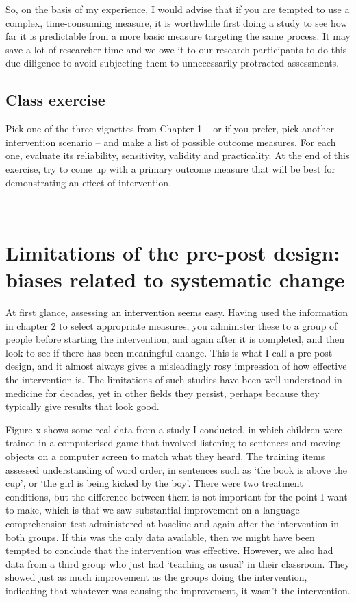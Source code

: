 \documentclass[]{book}
\begin{document}
So, on the basis of my experience, I would advise that if you are tempted to use a complex, time-consuming measure, it is worthwhile first doing a study to see how far it is predictable from a more basic measure targeting the same process. It may save a lot of researcher time and we owe it to our research participants to do this due diligence to avoid subjecting them to unnecessarily protracted assessments.

\hypertarget{class-exercise}{%
\section{Class exercise}\label{class-exercise}}

Pick one of the three vignettes from Chapter 1 -- or if you prefer, pick another intervention scenario -- and make a list of possible outcome measures. For each one, evaluate its reliability, sensitivity, validity and practicality. At the end of this exercise, try to come up with a primary outcome measure that will be best for demonstrating an effect of intervention.

 

\hypertarget{limitations-of-the-pre-post-design-biases-related-to-systematic-change}{%
\chapter{Limitations of the pre-post design: biases related to systematic change}\label{limitations-of-the-pre-post-design-biases-related-to-systematic-change}}

At first glance, assessing an intervention seems easy. Having used the information in chapter 2 to select appropriate measures, you administer these to a group of people before starting the intervention, and again after it is completed, and then look to see if there has been meaningful change. This is what I call a pre-post design, and it almost always gives a misleadingly rosy impression of how effective the intervention is. The limitations of such studies have been well-understood in medicine for decades, yet in other fields they persist, perhaps because they typically give results that look good.

Figure x shows some real data from a study I conducted, in which children were trained in a computerised game that involved listening to sentences and moving objects on a computer screen to match what they heard. The training items assessed understanding of word order, in sentences such as `the book is above the cup', or `the girl is being kicked by the boy'. There were two treatment conditions, but the difference between them is not important for the point I want to make, which is that we saw substantial improvement on a language comprehension test administered at baseline and again after the intervention in both groups. If this was the only data available, then we might have been tempted to conclude that the intervention was effective. However, we also had data from a third group who just had `teaching as usual' in their classroom. They showed just as much improvement as the groups doing the intervention, indicating that whatever was causing the improvement, it wasn't the intervention.
\end{document}
